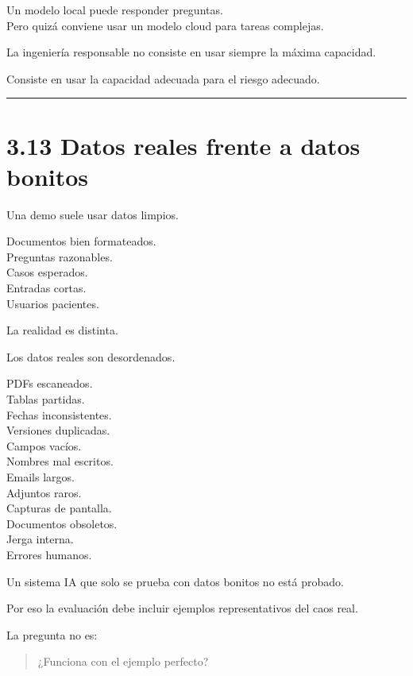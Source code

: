 Un modelo local puede responder preguntas.\\
Pero quizá conviene usar un modelo cloud para tareas complejas.

La ingeniería responsable no consiste en usar siempre la máxima
capacidad.

Consiste en usar la capacidad adecuada para el riesgo adecuado.

\begin{center}\rule{0.5\linewidth}{0.5pt}\end{center}

\section{3.13 Datos reales frente a datos
bonitos}\label{datos-reales-frente-a-datos-bonitos}

Una demo suele usar datos limpios.

Documentos bien formateados.\\
Preguntas razonables.\\
Casos esperados.\\
Entradas cortas.\\
Usuarios pacientes.

La realidad es distinta.

Los datos reales son desordenados.

PDFs escaneados.\\
Tablas partidas.\\
Fechas inconsistentes.\\
Versiones duplicadas.\\
Campos vacíos.\\
Nombres mal escritos.\\
Emails largos.\\
Adjuntos raros.\\
Capturas de pantalla.\\
Documentos obsoletos.\\
Jerga interna.\\
Errores humanos.

Un sistema IA que solo se prueba con datos bonitos no está probado.

Por eso la evaluación debe incluir ejemplos representativos del caos
real.

La pregunta no es:

\begin{quote}
¿Funciona con el ejemplo perfecto?
\end{quote}

